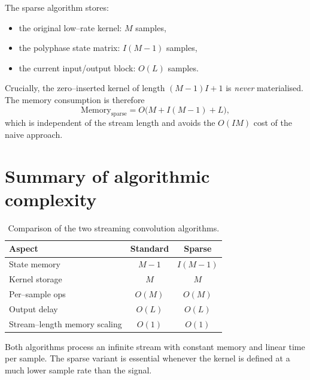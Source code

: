 \documentclass[a4paper,11pt]{article}
\begin{document}
The sparse algorithm stores:
\begin{itemize}
    \item the original low--rate kernel: $M$ samples,
    \item the polyphase state matrix: $I(M-1)$ samples,
    \item the current input/output block: $O(L)$ samples.
\end{itemize}
Crucially, the zero--inserted kernel of length $(M-1)I+1$ is \emph{never} materialised.  The memory consumption is therefore
\begin{equation}
    \boxed{
        \text{Memory}_{\text{sparse}} = O\bigl(M + I(M-1) + L\bigr) ,
    }
\end{equation}
which is independent of the stream length and avoids the $O(IM)$ cost of the naive approach.

\section{Summary of algorithmic complexity}

\begin{table}[h]
\centering
\begin{tabular}{@{}lcc@{}}
\toprule
\textbf{Aspect} & \textbf{Standard} & \textbf{Sparse} \\
\midrule
State memory & $M-1$ & $I(M-1)$ \\
Kernel storage & $M$ & $M$ \\
Per--sample ops & $O(M)$ & $O(M)$ \\
Output delay & $O(L)$ & $O(L)$ \\
Stream--length memory scaling & $O(1)$ & $O(1)$ \\
\bottomrule
\end{tabular}
\caption{Comparison of the two streaming convolution algorithms.}
\end{table}

Both algorithms process an infinite stream with constant memory and linear time per sample.  The sparse variant is essential whenever the kernel is defined at a much lower sample rate than the signal.
\end{document}
